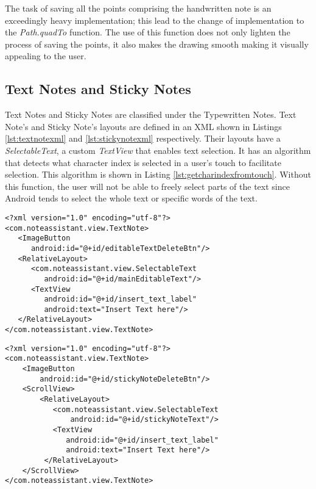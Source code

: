 The task of saving all the points comprising the handwritten note is an exceedingly heavy implementation; this lead to the change of implementation to the \textit{Path.quadTo} function. The use of this function does not only lighten the process of saving the points, it also makes the drawing smooth making it visually appealing to the user.

\subsection{Text Notes and Sticky Notes}
\label{sec:textnotesandstickynotes}

Text Notes and Sticky Notes are classified under the Typewritten Notes. Text Note's and Sticky Note's layouts are defined in an XML shown in Listings \ref{lst:textnotexml} and \ref{lst:stickynotexml} respectively. Their layouts have a \textit{SelectableText}, a custom \textit{TextView} that enables text selection. It has an algorithm that detects what character index is selected in a user’s touch to facilitate selection. This algorithm is shown in Listing \ref{lst:getcharindexfromtouch}. Without this function, the user will not be able to freely select parts of the text since Android tends to select the whole text or specific words of the text.

\begin{lstlisting}[frame=single, label=lst:textnotexml, caption=XML layout of text note]
<?xml version="1.0" encoding="utf-8"?>
<com.noteassistant.view.TextNote>
   <ImageButton
      android:id="@+id/editableTextDeleteBtn"/>
   <RelativeLayout>
      <com.noteassistant.view.SelectableText
         android:id="@+id/mainEditableText"/>
      <TextView
         android:id="@+id/insert_text_label"
         android:text="Insert Text here"/>
   </RelativeLayout>
</com.noteassistant.view.TextNote>
\end{lstlisting}

\begin{lstlisting}[frame=single, label=lst:stickynotexml, caption=XML layout of sticky note]
<?xml version="1.0" encoding="utf-8"?>
<com.noteassistant.view.TextNote>
    <ImageButton
        android:id="@+id/stickyNoteDeleteBtn"/>
    <ScrollView>
        <RelativeLayout>
           <com.noteassistant.view.SelectableText
               android:id="@+id/stickyNoteText"/>
           <TextView
              android:id="@+id/insert_text_label"
              android:text="Insert Text here"/>
         </RelativeLayout>
    </ScrollView>
</com.noteassistant.view.TextNote>
\end{lstlisting}

